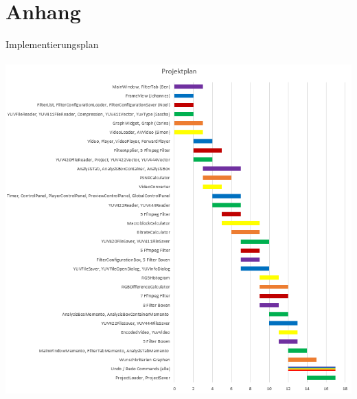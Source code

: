 \documentclass[twoside]{book}
\newcommand{\+}{\discretionary{\mbox{\scriptsize$\hookleftarrow$}}{}{}}
\begin{document}
\chapter{Anhang}
Implementierungsplan\\\\
{\centering\includegraphics[width=1\textwidth]{Projektplan_new.PNG}}\\
\end{document}
